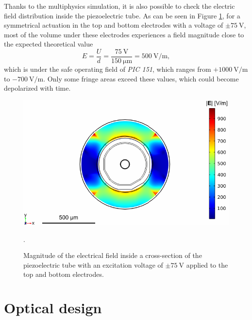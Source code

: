 \documentclass[10pt]{iopart}
\begin{document}

Thanks to the multiphysics simulation, it is also possible to check the electric field distribution inside the piezoelectric tube. As can be seen in Figure \ref{fig:field}, for a symmetrical actuation in the top and bottom electrodes with a voltage of $\pm \SI{75}{\volt}$, most of the volume under these electrodes experiences a field magnitude close to the expected theoretical value 
\begin{equation}
E= \frac{U}{d}  = \frac{\SI{75}{\volt}}{\SI{150}{\micro\meter}}  = \SI{500}{\volt/\meter},
\end{equation}
which is under the safe operating field of \textit{PIC 151}, which ranges from $ +\SI{1000}{\volt/\meter}$ to $ -\SI{700}{\volt/\meter}$. Only some fringe areas exceed these values, which could become depolarized with time.
\begin{figure}[h!]\centering
      \includegraphics[width=\columnwidth]{figures/field.pdf}
      \caption{Magnitude of the electrical field inside a cross-section of the piezoelectric tube with an excitation voltage of $\pm \SI{75}{\volt}$ applied to the top and bottom electrodes.}.
      \label{fig:field}
\end{figure}


\section{Optical design}
\end{document}
